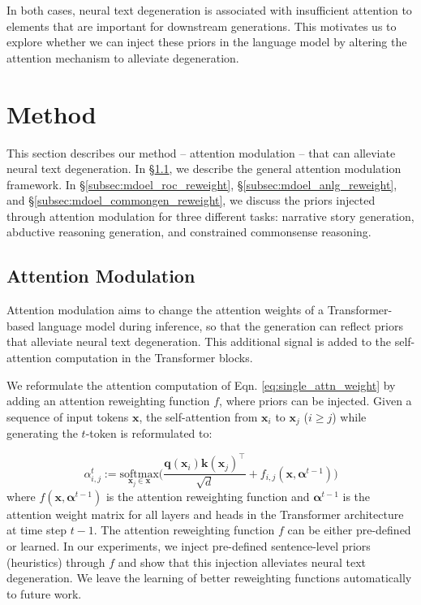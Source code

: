 \documentclass[11pt,a4paper]{article}
\newcommand{\alg}{attention modulation}
\begin{document}
In both cases, neural text degeneration is associated with insufficient attention to elements that are important for downstream generations. This motivates us to explore whether we can inject these priors in the language model by altering the attention mechanism to alleviate degeneration. 




\section{Method}\label{sec:model}
This section describes our method -- \alg{} -- that can alleviate neural text degeneration. In \S \ref{subsec:model_reweight_attention}, we describe the general \alg{} framework. In \S \ref{subsec:mdoel_roc_reweight}, \S \ref{subsec:mdoel_anlg_reweight}, and \S \ref{subsec:mdoel_commongen_reweight}, we discuss the priors injected through \alg{} for three different tasks: narrative story generation, abductive reasoning generation, and constrained commonsense reasoning. 

\subsection{Attention Modulation} \label{subsec:model_reweight_attention}
Attention modulation aims to change the attention weights of a Transformer-based language model during inference, so that the generation can reflect priors that alleviate neural text degeneration. This additional signal is added to the self-attention computation in the Transformer blocks. 

We reformulate the attention computation of Eqn. \ref{eq:single_attn_weight} by adding an attention reweighting function $f$, where priors can be injected. Given a sequence of input tokens $\bm{x}$, the self-attention from $\bm{x}_i$ to $\bm{x}_j$ ($i \geq j$) while generating the $t$-token is reformulated to:

\begin{equation}
\label{eq:attention_reweight}
    \alpha^t_{i,j} := \underset{\bm{x}_j \in \bm{x}}{\text{softmax}}
    \Big(\frac{\bm{q}(\bm{x}_i) \bm{k}(\bm{x}_j)^\top}{\sqrt{d}} + f_{i,j}(\bm{x}, \bm{\alpha}^{t-1}) \Big) 
\end{equation}
where $f(\bm{x}, \bm{\alpha}^{t-1})$ is the attention reweighting function and $\bm{\alpha}^{t-1}$ is the attention weight matrix for all layers and heads in the Transformer architecture at time step $t-1$. 
The attention reweighting function $f$ can be either pre-defined or learned. In our experiments, we inject pre-defined sentence-level priors (heuristics) through $f$ and show that this injection alleviates neural text degeneration. We leave the learning of better reweighting functions automatically to future work. 
\end{document}
